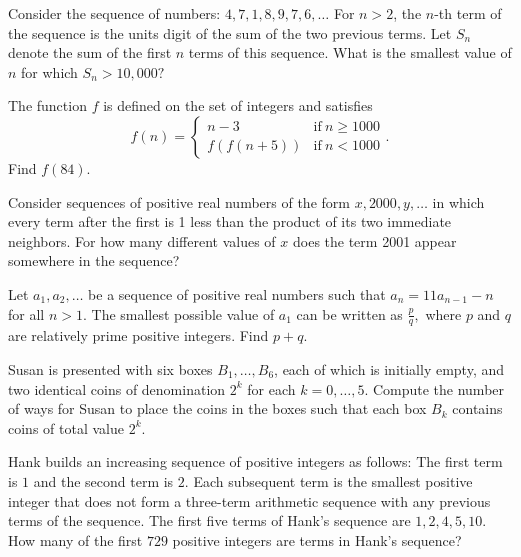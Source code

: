 \documentclass{article}
\begin{document}
\begin{prob}[AMC 12A 2002/21]{4}
Consider the sequence of numbers: $4,7,1,8,9,7,6,\dots$ For $n>2$, the $n$-th term of the sequence is the units digit of the sum of the two previous terms. Let $S_n$ denote the sum of the first $n$ terms of this sequence. What is the smallest value of $n$ for which $S_n>10,000?$
\end{prob}

\begin{prob}[AIME 1984/7]{4}
The function $f$ is defined on the set of integers and satisfies
\[f(n)=\begin{cases} n-3&\mbox{if}\ n\ge 1000\\ f(f(n+5))&\mbox{if}\ n<1000\end{cases}.\]
Find $f(84).$
\end{prob}
    
\begin{prob}[AMC 12A 2001/25]{4}
Consider sequences of positive real numbers of the form $x, 2000, y, \dots$ in which every term after the first is 1 less than the product of its two immediate neighbors. For how many different values of $x$ does the term 2001 appear somewhere in the sequence?
\end{prob}

\begin{req}[PUMaC 2017]{4}
Let $a_1,a_2,\dots$ be a sequence of positive real numbers such that $a_n=11a_{n-1}-n$ for all $n>1.$ The smallest possible value of $a_1$ can be written as $\frac{p}{q},$ where $p$ and $q$ are relatively prime positive integers. Find $p+q.$
\end{req}
    
\begin{req}[OMO 2019]{6}
Susan is presented with six boxes $B_1, \dots, B_6$, each of which is initially empty, and two identical coins of denomination $2^k$ for each $k = 0, \dots, 5$. Compute the number of ways for Susan to place the coins in the boxes such that each box $B_k$ contains coins of total value $2^k.$
\end{req}

\begin{prob}{6}
Hank builds an increasing sequence of positive integers as follows: The first term is $1$ and the second term is $2.$ Each subsequent term is the smallest positive integer that does not form a three-term arithmetic sequence with any previous terms of the sequence. The first five terms of Hank's sequence are $1,2,4,5,10.$ How many of the first $729$ positive integers are terms in Hank's sequence?
\end{prob}
\end{document}
